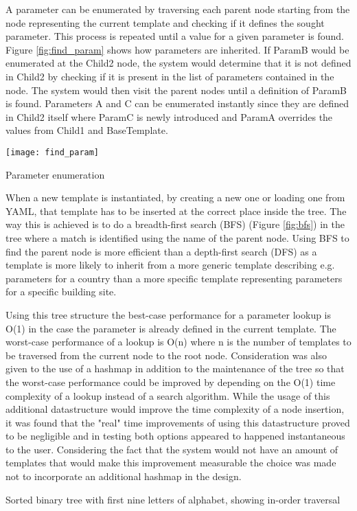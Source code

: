 A parameter can be enumerated by traversing each parent node starting from the node representing the current template and checking if it defines the sought parameter.
This process is repeated until a value for a given parameter is found.
Figure \ref{fig:find_param} shows how parameters are inherited.
If ParamB would be enumerated at the Child2 node, the system would determine that it is not defined in Child2 by checking if it is present in the list of parameters contained in the node.
The system would then visit the parent nodes until a definition of ParamB is found.
Parameters A and C can be enumerated instantly since they are defined in Child2 itself where ParamC is newly introduced and ParamA overrides the values from Child1 and BaseTemplate.
\begin{marginfigure}
	\centering
	\texttt{[image: find\_param]}
	\caption{Parameter enumeration}
	\label{fig:find_param}
\end{marginfigure}

When a new template is instantiated, by creating a new one or loading one from YAML, that template has to be inserted at the correct place inside the tree.
The way this is achieved is to do a breadth-first search (BFS) (Figure \ref{fig:bfs}) in the tree where a match is identified using the name of the parent node.
Using BFS to find the parent node is more efficient than a depth-first search (DFS) as a template is more likely to inherit from a more generic template describing e.g. parameters for a country than a more specific template representing parameters for a specific building site.

Using this tree structure the best-case performance for a parameter lookup is O(1) in the case the parameter is already defined in the current template.
The worst-case performance of a lookup is O(n) where n is the number of templates to be traversed from the current node to the root node.
Consideration was also given to the use of a hashmap in addition to the maintenance of the tree so that the worst-case performance could be improved by depending on the O(1) time complexity of a lookup instead of a search algorithm.
While the usage of this additional datastructure would improve the time complexity of a node insertion, it was found that the "real" time improvements of using this datastructure proved to be negligible and in testing both options appeared to happened instantaneous to the user.
Considering the fact that the system would not have an amount of templates that would make this improvement measurable the choice was made not to incorporate an additional hashmap in the design.
\begin{marginfigure}
	\centering
	
	\caption{Sorted binary tree with first nine letters of alphabet, showing in-order traversal\cite{pluke_sorted_2010}}
	\label{fig:bfs}
\end{marginfigure}

